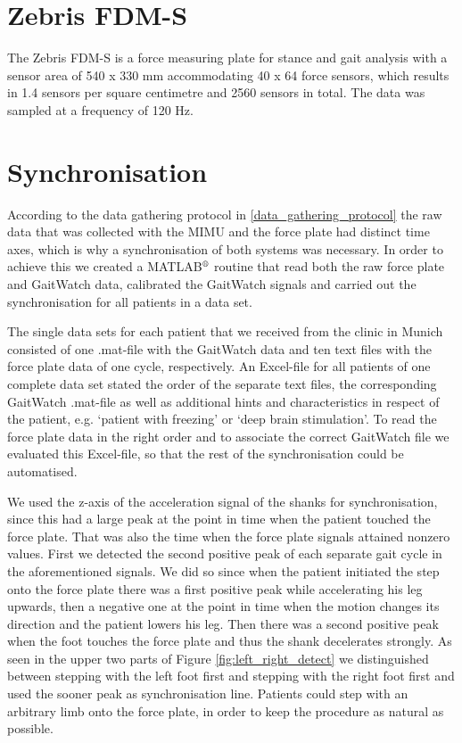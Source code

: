 \section{Zebris FDM-S}

The Zebris FDM-S \cite{zebris_force_plate_2013} is a force measuring plate for stance and gait analysis with a sensor area of 540 x 330 mm accommodating 40 x 64 force sensors, which results in 1.4 sensors per square centimetre and 2560 sensors in total. The data was sampled at a frequency of 120 Hz.

\section{Synchronisation}

According to the data gathering protocol in \ref{data_gathering_protocol} the raw data that was collected with the MIMU and the force plate had distinct time axes, which is why a synchronisation of both systems was necessary. In order to achieve this we created a MATLAB$\textsuperscript{\textregistered}$ routine that read both the raw force plate and GaitWatch data, calibrated the GaitWatch signals and carried out the synchronisation for all patients in a data set.

The single data sets for each patient that we received from the clinic in Munich consisted of one .mat-file with the GaitWatch data and ten text files with the force plate data of one cycle, respectively. An Excel-file for all patients of one complete data set stated the order of the separate text files, the corresponding GaitWatch .mat-file as well as additional hints and characteristics in respect of the patient, e.g. `patient with freezing' or `deep brain stimulation'. To read the force plate data in the right order and to associate the correct GaitWatch file we evaluated this Excel-file, so that the rest of the synchronisation could be automatised.

We used the z-axis of the acceleration signal of the shanks for synchronisation, since this had a large peak at the point in time when the patient touched the force plate. That was also the time when the force plate signals attained nonzero values.  First we detected the second positive peak of each separate gait cycle in the aforementioned signals. We did so since when the patient initiated the step onto the force plate there was a first positive peak while accelerating his leg upwards, then a negative one at the point in time when the motion changes its direction and the patient lowers his leg. Then there was a second positive peak when the foot touches the force plate and thus the shank decelerates strongly. As seen in the upper two parts of Figure \ref{fig:left_right_detect} we distinguished between stepping with the left foot first and stepping with the right foot first and used the sooner peak as synchronisation line. Patients could step with an arbitrary limb onto the force plate, in order to keep the procedure as natural as possible.

